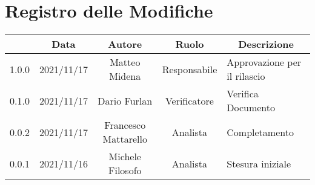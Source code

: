 \thispagestyle{empty}
\section*{Registro delle Modifiche}

\begin{center}
	\renewcommand{\arraystretch}{1.8}
	\begin{longtable}[c]{c | c | c | c | p{5cm}}
		\rowcolor[HTML]{125E28}
		\multicolumn{1}{c}{\color[HTML]{FFFFFF} \textbf{Versione}} & 
		\multicolumn{1}{c}{\color[HTML]{FFFFFF} \textbf{Data}} & 
		\multicolumn{1}{c}{\color[HTML]{FFFFFF} \textbf{Autore}} & 
		\multicolumn{1}{c}{\color[HTML]{FFFFFF} \textbf{Ruolo}} & 
		\multicolumn{1}{c}{\color[HTML]{FFFFFF} \textbf{Descrizione}} \\
		\endhead
		1.0.0 & 2021/11/17 & Matteo Midena & Responsabile & Approvazione per il rilascio \\
		0.1.0 & 2021/11/17 & Dario Furlan & Verificatore & Verifica Documento \\
		0.0.2 & 2021/11/17 & Francesco Mattarello & Analista & Completamento \\
		0.0.1 & 2021/11/16 & Michele Filosofo & Analista & Stesura iniziale \\

	\end{longtable}
\end{center}